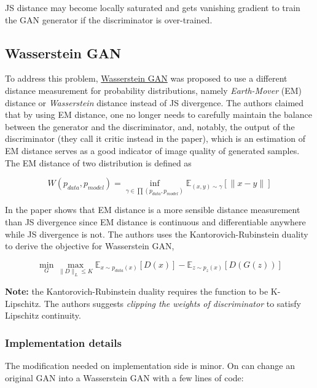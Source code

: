 \documentclass[]{book}
\theoremstyle{definition}
\theoremstyle{definition}
\theoremstyle{definition}
\theoremstyle{remark}
\begin{document}
JS distance may become locally saturated and gets vanishing gradient to
train the GAN generator if the discriminator is over-trained.

\subsection{Wasserstein GAN}\label{wasserstein-gan}

To address this problem,
\href{https://arxiv.org/pdf/1701.07875.pdf}{Wasserstein GAN} was
proposed to use a different distance measurement for probability
distributions, namely \emph{Earth-Mover} (EM) distance or
\emph{Wasserstein} distance instead of JS divergence. The authors
claimed that by using EM distance, one no longer needs to carefully
maintain the balance between the generator and the discriminator, and,
notably, the output of the discriminator (they call it critic instead in
the paper), which is an estimation of EM distance serves as a good
indicator of image quality of generated samples. The EM distance of two
distribution is defined as

\[W(p_{data}, p_{model})=\inf_{\gamma\in\prod(p_{data},p_{model})}\mathbb{E}_{(x,y)\sim\gamma}\left[\|x-y\|\right]\]

In the paper shows that EM distance is a more sensible distance
measurement than JS divergence since EM distance is continuous and
differentiable anywhere while JS divergence is not. The authors uses the
Kantorovich-Rubinstein duality to derive the objective for Wasserstein
GAN,

\[\min_G\max_{\|D\|_L\leq K} \mathbb{E}_{x\sim p_{data}(x)}[D(x)] - \mathbb{E}_{z\sim p_z(x)}[D(G(z))]\]

\textbf{Note: }the Kantorovich-Rubinstein duality requires the function
to be K-Lipschitz. The authors suggests \emph{clipping the weights of
discriminator} to satisfy Lipschitz continuity.

\subsubsection{Implementation details}\label{implementation-details}

The modification needed on implementation side is minor. On can change
an original GAN into a Wasserstein GAN with a few lines of code:
\end{document}
